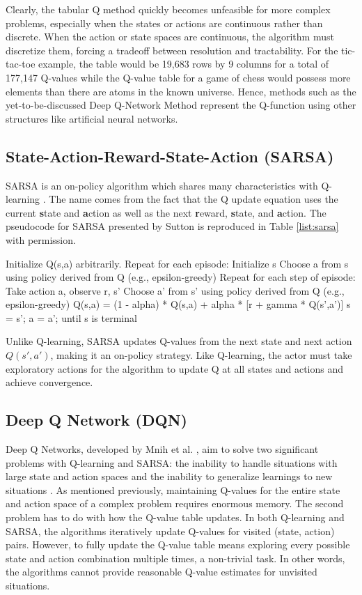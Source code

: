 Clearly, the tabular Q method quickly becomes unfeasible for more complex problems, especially when the states or actions are continuous rather than discrete. When the action or state spaces are continuous, the algorithm must discretize them, forcing a tradeoff between resolution and tractability. For the tic-tac-toe example, the table would be 19,683 rows by 9 columns for a total of 177,147 Q-values while the Q-value table for a game of chess would possess more elements than there are atoms in the known universe. Hence, methods such as the yet-to-be-discussed Deep Q-Network Method represent the Q-function using other structures like artificial neural networks.

\subsection{State-Action-Reward-State-Action (SARSA)}
SARSA is an on-policy algorithm which shares many characteristics with Q-learning \cite{sutton_2017}. The name comes from the fact that the Q update equation uses the current \textbf{s}tate and \textbf{a}ction as well as the next \textbf{r}eward, \textbf{s}tate, and \textbf{a}ction. The pseudocode for SARSA presented by Sutton is reproduced in Table \ref{list:sarsa} with permission.
\begin{clisting}[caption={SARSA Pseudocode},label={list:sarsa}]
Initialize Q(s,a) arbitrarily. 
Repeat for each episode: 
	Initialize s
	Choose a from s using policy derived from Q (e.g., epsilon-greedy)
	Repeat for each step of episode:
		Take action a, observe r, s'
		Choose a' from s' using policy derived from Q (e.g., epsilon-greedy)
		Q(s,a) = (1 - alpha) * Q(s,a) + alpha * [r + gamma * Q(s',a')]
		s = s'; a = a';
	until s is terminal 
\end{clisting}

Unlike Q-learning, SARSA updates Q-values from the next state and next action $Q(s',a')$, making it an on-policy strategy. Like Q-learning, the actor must take exploratory actions for the algorithm to update Q at all states and actions and achieve convergence.

\subsection{Deep Q Network (DQN)}
Deep Q Networks, developed by Mnih et al. \cite{Mnih_2015}, aim to solve two significant problems with Q-learning and SARSA: the inability to handle situations with large state and action spaces and the inability to generalize learnings to new situations \cite{sutton_policygrad}. As mentioned previously, maintaining Q-values for the entire state and action space of a complex problem requires enormous memory. The second problem has to do with how the Q-value table updates. In both Q-learning and SARSA, the algorithms iteratively update Q-values for visited (state, action) pairs. However, to fully update the Q-value table means exploring every possible state and action combination multiple times, a non-trivial task. In other words, the algorithms cannot provide reasonable Q-value estimates for unvisited situations.


